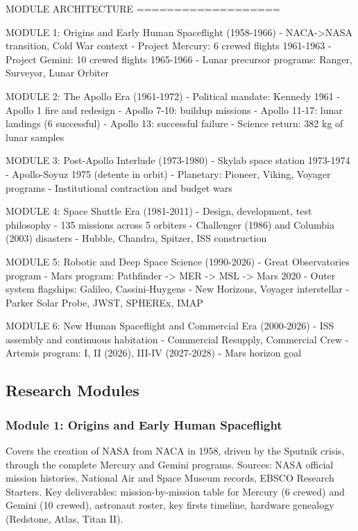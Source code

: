 \documentclass[11pt,letterpaper]{article}
\begin{document}
\begin{asciibox}
MODULE ARCHITECTURE
===================

MODULE 1: Origins and Early Human Spaceflight (1958-1966)
  - NACA->NASA transition, Cold War context
  - Project Mercury: 6 crewed flights 1961-1963
  - Project Gemini: 10 crewed flights 1965-1966
  - Lunar precursor programs: Ranger, Surveyor, Lunar Orbiter

MODULE 2: The Apollo Era (1961-1972)
  - Political mandate: Kennedy 1961
  - Apollo 1 fire and redesign
  - Apollo 7-10: buildup missions
  - Apollo 11-17: lunar landings (6 successful)
  - Apollo 13: successful failure
  - Science return: 382 kg of lunar samples

MODULE 3: Post-Apollo Interlude (1973-1980)
  - Skylab space station 1973-1974
  - Apollo-Soyuz 1975 (detente in orbit)
  - Planetary: Pioneer, Viking, Voyager programs
  - Institutional contraction and budget wars

MODULE 4: Space Shuttle Era (1981-2011)
  - Design, development, test philosophy
  - 135 missions across 5 orbiters
  - Challenger (1986) and Columbia (2003) disasters
  - Hubble, Chandra, Spitzer, ISS construction

MODULE 5: Robotic and Deep Space Science (1990-2026)
  - Great Observatories program
  - Mars program: Pathfinder -> MER -> MSL -> Mars 2020
  - Outer system flagships: Galileo, Cassini-Huygens
  - New Horizons, Voyager interstellar
  - Parker Solar Probe, JWST, SPHEREx, IMAP

MODULE 6: New Human Spaceflight and Commercial Era (2000-2026)
  - ISS assembly and continuous habitation
  - Commercial Resupply, Commercial Crew
  - Artemis program: I, II (2026), III-IV (2027-2028)
  - Mars horizon goal
\end{asciibox}

\subsection{Research Modules}

\subsubsection{Module 1: Origins and Early Human Spaceflight}

Covers the creation of NASA from NACA in 1958, driven by the Sputnik crisis, through the complete Mercury and Gemini programs. Sources: NASA official mission histories, National Air and Space Museum records, EBSCO Research Starters. Key deliverables: mission-by-mission table for Mercury (6 crewed) and Gemini (10 crewed), astronaut roster, key firsts timeline, hardware genealogy (Redstone, Atlas, Titan II).
\end{document}
